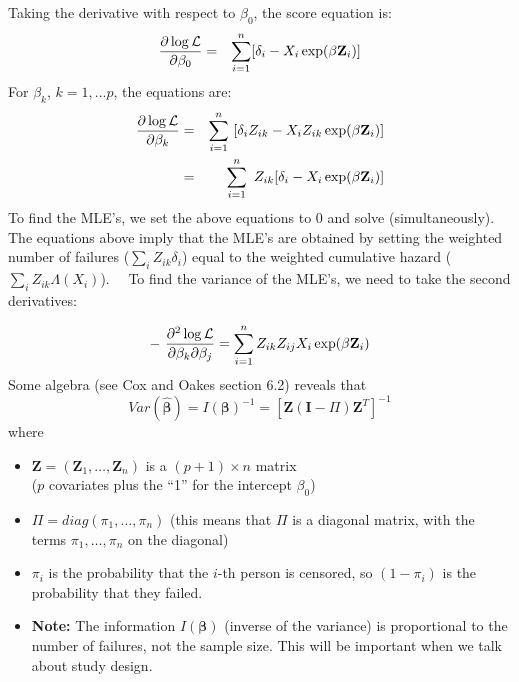 \documentclass[11pt,psfig]{book}
\newcommand{\bfZ}{\mathbf{Z}}
\newcommand{\bfbeta}{\mathbf{\beta}}
\newcommand{\bfI}{\mathbf{I}}
\begin{document}
Taking the derivative with respect to $\beta_0$, the
score equation is:
\begin{eqnarray*}
\frac{\partial\log{\cal L}}{\partial \beta_0}
& =  &  \sum_{i=1}^{n}  [ {\delta_i} - X_i \exp( \bfbeta \bfZ_i )]  \\
\end{eqnarray*}
For $\beta_k$, $k=1,...p$, the equations are:
\begin{eqnarray*}
\frac{\partial\log{\cal L}}{\partial \beta_k}   & =  &
\sum_{i=1}^{n} ~ [ {\delta_i} Z_{ik} - X_i Z_{ik} \exp( \bfbeta \bfZ_i )]\\
& =  &  \sum_{i=1}^{n} ~ Z_{ik} [{\delta_i} - X_i \exp( \bfbeta \bfZ_i )]
\end{eqnarray*}
To find the MLE's, we set the above equations to 0 and
solve (simultaneously).  The equations above imply that
the MLE's are obtained by setting the weighted number
of failures ($\sum_i Z_{ik} \delta_i$) equal to the weighted
cumulative hazard ($\sum_i Z_{ik} \Lambda(X_i)$).
\
\
To find the variance of the MLE's, we need to take the
second derivatives:

\[ -~ \frac{\partial^2\log{\cal L}  }{\partial \beta_k \partial \beta_j}
=\sum_{i=1}^{n} Z_{ik}Z_{ij} X_i \exp( \bfbeta \bfZ_i )\]
Some algebra (see Cox and Oakes section 6.2) reveals that
\[ Var(\widehat{\bfbeta}) = I(\bfbeta)^{-1} =
\left[ \bfZ (\bfI-\Pi) \bfZ^T \right]^{-1} \]
where
\begin{itemize}
\item $\bfZ=(\bfZ_1,\ldots,\bfZ_n)$ is a $(p+1)\times n$ matrix\\
($p$ covariates plus the ``1'' for the intercept $\beta_0$)

\vspace{0.2in}
\item $\Pi=diag(\pi_1,\ldots,\pi_n)$ (this means that $\Pi$ is a
diagonal matrix, with the terms $\pi_1,\ldots,\pi_n$ on the diagonal)

\vspace{0.2in}
\item $\pi_i$ is the probability that the $i$-{th} person is censored,
so $(1-\pi_i)$ is the probability that they failed.

\vspace{0.2in}
\item  {\bf Note:} The information $I(\bfbeta)$ (inverse of the
variance) is proportional to the number of failures, not the sample
size.  This will be important when we talk about study design.
\end{itemize}
\
\
\end{document}

